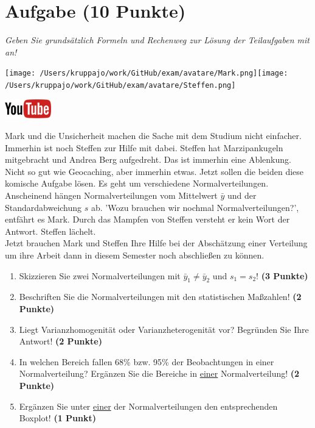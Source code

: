 \documentclass[a4paper, 9pt]{scrartcl}\usepackage[]{graphicx}\usepackage[]{xcolor}
\begin{document}
\section{Aufgabe \hfill (10 Punkte)}

\textit{Geben Sie grundsätzlich Formeln und Rechenweg zur Lösung der Teilaufgaben mit an!} \\[1Ex]
 

 
\begin{minipage}[t]{0.5\textwidth}
\texttt{[image: /Users/kruppajo/work/GitHub/exam/avatare/Mark.png]}\hspace{-4mm}\texttt{[image: /Users/kruppajo/work/GitHub/exam/avatare/Steffen.png]}
\end{minipage}
\begin{minipage}[t]{0.5\textwidth}
\hfill
\href{https://youtu.be/ZrJhn2wPbq4}{\includegraphics[width = 2cm]{img/youtube}}
\end{minipage}
\vspace{1ex}



Mark und die Unsicherheit machen die Sache mit dem Studium nicht einfacher. Immerhin ist noch Steffen zur Hilfe mit dabei. Steffen hat Marzipankugeln mitgebracht und Andrea Berg aufgedreht. Das ist immerhin eine Ablenkung. Nicht so gut wie Geocaching, aber immerhin etwas. Jetzt sollen die beiden diese komische Aufgabe lösen. Es geht um verschiedene Normalverteilungen. Anscheinend hängen Normalverteilungen vom Mittelwert $\bar{y}$ und der Standardabweichung $s$ ab. 'Wozu brauchen wir nochmal Normalverteilungen?', entfährt es Mark. Durch das Mampfen von Steffen versteht er kein Wort der Antwort. Steffen lächelt.\\



Jetzt brauchen Mark und Steffen Ihre Hilfe bei der Abschätzung einer Verteilung um ihre Arbeit dann in diesem Semester noch abschließen zu können.

\begin{enumerate}
\item Skizzieren Sie zwei Normalverteilungen mit $\bar{y}_1 \neq \bar{y}_2$ und $s_1 = s_2$! \textbf{(3 Punkte)}
\item Beschriften Sie die Normalverteilungen mit den statistischen Maßzahlen! \textbf{(2 Punkte)}
\item Liegt Varianzhomogenität oder Varianzheterogenität vor? Begründen Sie Ihre Antwort! \textbf{(2 Punkte)}
\item In welchen Bereich fallen 68\% bzw. 95\% der Beobachtungen in einer Normalverteilung? Ergänzen Sie die Bereiche in \underline{einer} Normalverteilung! \textbf{(2 Punkte)}
\item Ergänzen Sie unter \underline{einer} der Normalverteilungen den entsprechenden Boxplot! \textbf{(1 Punkt)}
\end{enumerate}
\end{document}
